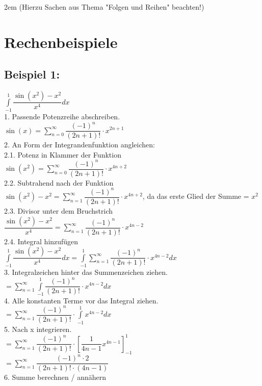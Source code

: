 \documentclass[11pt,final]{scrreprt}
\newcommand{\br} {\medskip\\}
\begin{document}
\begingroup
\leftskip2em 
(Hierzu Sachen aus Thema "Folgen und Reihen" beachten!)\\
\par	
\endgroup 

\newpage
\section{Rechenbeispiele}
\subsection*{Beispiel 1:}
\hspace*{2em} $\int\limits_{-1}^1 \dfrac{\sin(x^2)-x^2}{x^4} dx $\br
1. Passende Potenzreihe abschreiben.\\
\hspace*{2em} $\sin(x) = \sum\limits_{n=0}^\infty \dfrac{(-1)^n}{(2n+1)!} \cdot x^{2n+1}$\br
2. An Form der Integrandenfunktion angleichen:\br
2.1. Potenz in Klammer der Funktion\\
\hspace*{2em} $ \sin(x^2) = \sum\limits_{n=0}^\infty \dfrac{(-1)^n}{(2n+1)!} \cdot x^{4n+2} $\br
2.2. Subtrahend nach der Funktion\\
\hspace*{2em} $ \sin(x^2)-x^2 = \sum\limits_{n=1}^\infty \dfrac{(-1)^n}{(2n+1)!} \cdot x^{4n+2} $, da das erste Glied der Summe = $x^2$\br
2.3. Divisor unter dem Bruchstrich\\
\hspace*{2em} $ \dfrac{\sin(x^2)-x^2}{x^4} = \sum\limits_{n=1}^\infty \dfrac{(-1)^n}{(2n+1)!} \cdot x^{4n-2} $\br
2.4. Integral hinzufügen\\
\hspace*{2em} $ \int\limits_{-1}^1\dfrac{\sin(x^2)-x^2}{x^4} dx = \int\limits_{-1}^1\sum\limits_{n=1}^\infty \dfrac{(-1)^n}{(2n+1)!} \cdot x^{4n-2} dx$\br
3. Integralzeichen hinter das Summenzeichen ziehen.\\
\hspace*{2em} $ = \sum\limits_{n=1}^\infty\int\limits_{-1}^1 \dfrac{(-1)^n}{(2n+1)!} \cdot x^{4n-2} dx $\br
4. Alle konstanten Terme vor das Integral ziehen.\\
\hspace*{2em} $ =\sum\limits_{n=1}^\infty \dfrac{(-1)^n}{(2n+1)!} \cdot \int\limits_{-1}^1 x^{4n-2} dx $\br
5. Nach x integrieren.\\
\hspace*{2em} $ =\sum\limits_{n=1}^\infty \dfrac{(-1)^n}{(2n+1)!} \cdot [\dfrac{1}{4n-1}x^{4n-1}]_{-1}^1$\\
\hspace*{2em} $ =\sum\limits_{n=1}^\infty \dfrac{(-1)^n\cdot 2}{(2n+1)!\cdot (4n-1)}$\br
6. Summe berechnen / annähern
 
\end{document}
